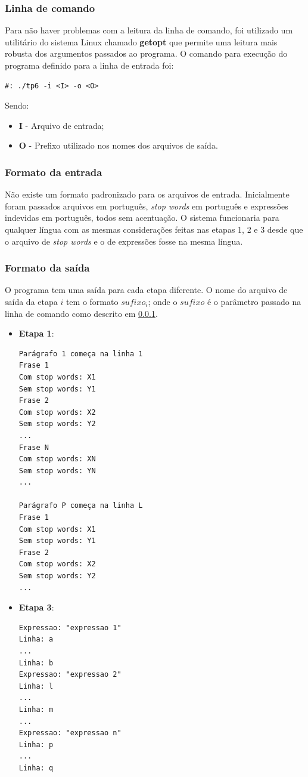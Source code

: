 \documentclass[12pt]{article}
\begin{document}
\subsubsection{Linha de comando}
\label{linha_de_comando}
Para não haver problemas com a leitura da linha de comando, foi utilizado um utilitário do
sistema Linux chamado \textbf{getopt} que permite uma leitura mais robusta dos argumentos
passados ao programa. O comando para execução do programa definido para a linha de entrada 
foi:
\begin{verbatim}
#: ./tp6 -i <I> -o <O>
\end{verbatim}
Sendo: 
\begin{itemize}
  \item \textbf{I} - Arquivo de entrada;
  \item \textbf{O} - Prefixo utilizado nos nomes dos arquivos de saída.
\end{itemize}

\subsubsection{Formato da entrada}
Não existe um formato padronizado para os arquivos de entrada. Inicialmente foram passados arquivos em português, \textit{stop words} em português e expressões indevidas em português, todos sem acentuação. O sistema funcionaria para qualquer língua com as mesmas considerações feitas nas etapas 1, 2 e 3 desde que o arquivo de \textit{stop words} e o de expressões fosse na mesma língua.

\subsubsection{Formato da saída}
O programa tem uma saída para cada etapa diferente. O nome do arquivo de saída da etapa $i$ tem o formato $sufixo_{i}$; onde o $sufixo$ é o parâmetro passado na linha de comando como descrito em \ref{linha_de_comando}.

\begin{itemize}
  \item \textbf{Etapa 1}: 
  \begin{verbatim}
Parágrafo 1 começa na linha 1
Frase 1
Com stop words: X1
Sem stop words: Y1
Frase 2
Com stop words: X2
Sem stop words: Y2
...
Frase N
Com stop words: XN
Sem stop words: YN
...

Parágrafo P começa na linha L
Frase 1
Com stop words: X1
Sem stop words: Y1
Frase 2
Com stop words: X2
Sem stop words: Y2
...
  \end{verbatim}
  \item \textbf{Etapa 3}: 
  \begin{verbatim}
Expressao: "expressao 1"
Linha: a
...
Linha: b
Expressao: "expressao 2"
Linha: l
...
Linha: m
...
Expressao: "expressao n"
Linha: p
...
Linha: q
  \end{verbatim}
\end{itemize}
\end{document}
